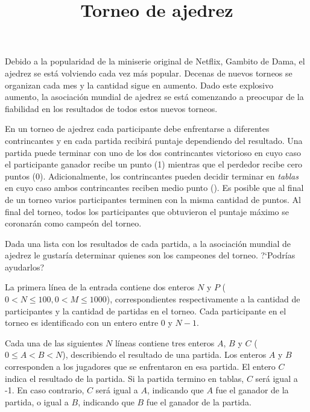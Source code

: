 \documentclass{oci}
\title{Torneo de ajedrez}
\begin{document}
\begin{problemDescription}
  Debido a la popularidad de la miniserie original de Netflix, Gambito de Dama, el ajedrez
  se está volviendo cada vez más popular.
  Decenas de nuevos torneos se organizan cada mes y la cantidad sigue en aumento.
  Dado este explosivo aumento, la asociación mundial de ajedrez se está comenzando a preocupar
  de la fiabilidad en los resultados de todos estos nuevos torneos.

  En un torneo de ajedrez cada participante debe enfrentarse a diferentes contrincantes y en cada
  partida recibirá puntaje dependiendo del resultado.
  Una partida puede terminar con uno de los dos contrincantes victorioso en cuyo caso el
  participante ganador recibe un punto (1) mientras que el perdedor recibe cero puntos (0).
  Adicionalmente, los contrincantes pueden decidir terminar en \emph{tablas} en cuyo caso ambos
  contrincantes reciben medio punto ().
  Es posible
  que al final de un torneo varios participantes terminen con la misma cantidad de puntos.
  Al final del torneo, todos los participantes que obtuvieron el puntaje máximo se coronarán
  como campeón del torneo.

  Dada una lista con los resultados de cada partida, a la asociación
  mundial de ajedrez le gustaría determinar quienes son los campeones del torneo.
  ?`Podrías ayudarlos?
\end{problemDescription}

\begin{inputDescription}
  La primera línea de la entrada contiene dos enteros $N$ y $P$ ($0 < N \leq 100, 0 < M \leq 1000$),
  correspondientes respectivamente a la cantidad de participantes y la cantidad de partidas
  en el torneo.
  Cada participante en el torneo es identificado con un entero entre 0 y $N-1$.

  Cada una de las siguientes $N$ líneas contiene tres enteros $A$, $B$ y $C$
  ($0\leq A < B < N$), describiendo el resultado de una partida.
  Los enteros $A$ y $B$ corresponden a los jugadores que se enfrentaron en esa partida.
  El entero $C$ indica el resultado de la partida.
  Si la partida termino en tablas, $C$ será igual a {-1}.
  En caso contrario, $C$ será igual a $A$, indicando que $A$ fue el ganador de la partida, o igual
  a $B$, indicando que $B$ fue el ganador de la partida.
\end{inputDescription}
\end{document}
